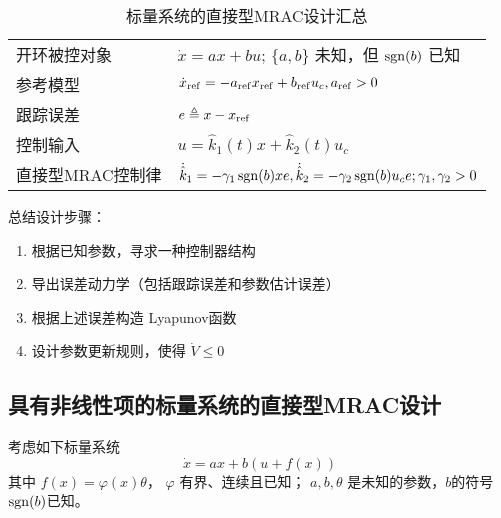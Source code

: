 \begin{table}[htbp]
  \centering
  \setcellgapes{4pt}
  \makegapedcells
  \caption{标量系统的直接型MRAC设计汇总}
  \begin{tabular}{p{4.0cm}p{10.0cm}}
    \hline
    开环被控对象     & $\dot{x} = a  x + b  u$; $\{ a, b \}$ 未知，但 $\operatorname{sgn} (b)$ 已知                          \\
    参考模型       & $\dot{x}_{\operatorname{ref}} = -  a_{\operatorname{ref}} x_{\operatorname{ref}} +  b_{\operatorname{ref}} u_c,a_{\operatorname{ref}}>0$ \\
    跟踪误差       & $e \triangleq x - x_{\operatorname{ref}}$                                                    \\
    控制输入       & $u = \hat{k}_1 (t) x + \hat{k}_2 (t) u_c$                                         \\
    直接型MRAC控制律 & $\dot{\hat{k}}_1 = -  \gamma_1  \operatorname{sgn} (b) x  e,
    \dot{\hat{k}}_2 = -  \gamma_2 \operatorname{sgn} (b)  u_c e ; \gamma_1, \gamma_2 > 0$                        \\
    \hline
  \end{tabular}
\end{table}

总结设计步骤：
\begin{enumerate}
  \item 根据已知参数，寻求一种控制器结构

  \item 导出误差动力学（包括跟踪误差和参数估计误差）

  \item 根据上述误差构造 Lyapunov函数

  \item 设计参数更新规则，使得 $\dot{V} \leq 0$
\end{enumerate}
\subsection{具有非线性项的标量系统的直接型MRAC设计}

考虑如下标量系统
\begin{equation}
  \dot{x} = a  x + b  (u + f (x)) \label{Sys:MRAC:nonlinear}
\end{equation}
其中 $f (x) = \varphi (x) \theta$， $\varphi$ 有界、连续且已知； $a, b, \theta$ 是未知的参数，$b$的符号$\operatorname{sgn}(b)$已知。

